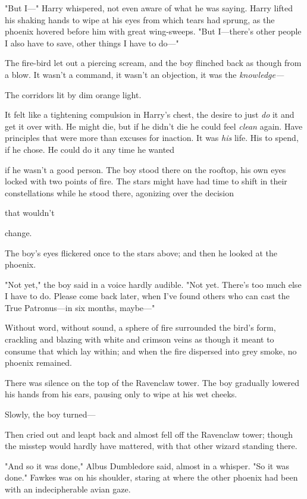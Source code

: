 "But I—" Harry whispered, not even aware of what he was saying. Harry lifted
his shaking hands to wipe at his eyes from which tears had sprung, as the
phoenix hovered before him with great wing-sweeps. "But I—there's other
people I also have to save, other things I have to do—"

The fire-bird let out a piercing scream, and the boy flinched back as though
from a blow. It wasn't a command, it wasn't an objection, it was the
\emph{knowledge—}

The corridors lit by dim orange light.

It felt like a tightening compulsion in Harry's chest, the desire to just
\emph{do} it and get it over with. He might die, but if he didn't die he could
feel \emph{clean} again. Have principles that were more than excuses for
inaction. It was \emph{his} life. His to spend, if he chose. He could do it any
time he wanted{\el}

{\el} if he wasn't a good person.
\sbreak
The boy stood there on the rooftop, his own eyes locked with two points of
fire. The stars might have had time to shift in their constellations while he
stood there, agonizing over the decision{\el}

{\el} that wouldn't{\el}

{\el} change.

The boy's eyes flickered once to the stars above; and then he looked at the
phoenix.

"Not yet," the boy said in a voice hardly audible. "Not yet. There's too much
else I have to do. Please come back later, when I've found others who can cast
the True Patronus—in six months, maybe—"

Without word, without sound, a sphere of fire surrounded the bird's form,
crackling and blazing with white and crimson veins as though it meant to
consume that which lay within; and when the fire dispersed into grey smoke, no
phoenix remained.

There was silence on the top of the Ravenclaw tower. The boy gradually lowered
his hands from his ears, pausing only to wipe at his wet cheeks.

Slowly, the boy turned—

Then cried out and leapt back and almost fell off the Ravenclaw tower; though
the misstep would hardly have mattered, with that other wizard standing there.

"And so it was done," Albus Dumbledore said, almost in a whisper. "So it was
done." Fawkes was on his shoulder, staring at where the other phoenix had been
with an indecipherable avian gaze.

